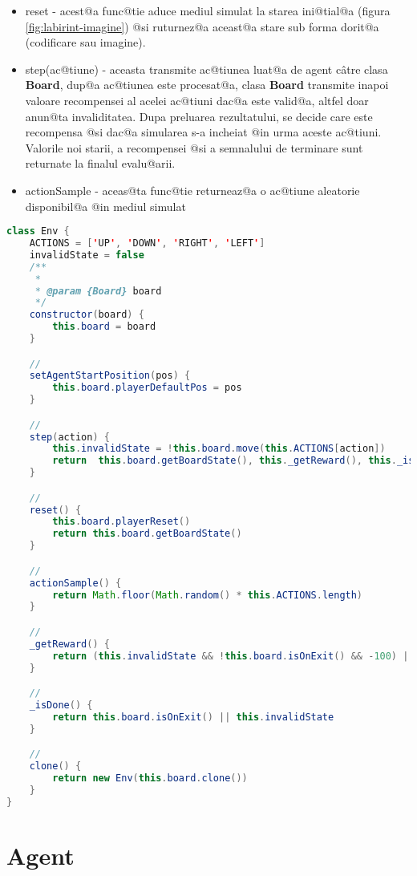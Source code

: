 \begin{itemize}
	\item reset - acest@a func@tie aduce mediul simulat la starea ini@tial@a (figura \ref{fig:labirint-imagine}) @si ruturnez@a aceast@a stare sub forma dorit@a (codificare sau imagine).
	\item step(ac@tiune) - aceasta transmite ac@tiunea luat@a de agent c\^ atre clasa \textbf{Board}, dup@a ac@tiunea este procesat@a, clasa \textbf{Board} transmite inapoi valoare recompensei al acelei ac@tiuni dac@a este valid@a, altfel doar anun@ta invaliditatea. Dupa preluarea rezultatului, se decide care este recompensa @si dac@a simularea s-a incheiat @in urma aceste ac@tiuni. Valorile noi starii, a recompensei @si a semnalului de terminare sunt returnate la finalul evalu@arii.
	\item actionSample - aceas@ta func@tie returneaz@a o ac@tiune aleatorie disponibil@a @in mediul simulat
\end{itemize}



\begin{lstlisting}[language=Java, caption=Definirea clasei Env]
class Env {
    ACTIONS = ['UP', 'DOWN', 'RIGHT', 'LEFT']
    invalidState = false
    /**
     * 
     * @param {Board} board 
     */
    constructor(board) {
        this.board = board
    }

    //
    setAgentStartPosition(pos) {
        this.board.playerDefaultPos = pos
    }

    // 
    step(action) {
        this.invalidState = !this.board.move(this.ACTIONS[action])
        return  this.board.getBoardState(), this._getReward(), this._isDone()]
    }

    //
    reset() {
        this.board.playerReset()
        return this.board.getBoardState()
    }

    //
    actionSample() {
        return Math.floor(Math.random() * this.ACTIONS.length)
    }

    //
    _getReward() {
        return (this.invalidState && !this.board.isOnExit() && -100) || this.board.getPlayerCellValue()
    }

    //
    _isDone() {
        return this.board.isOnExit() || this.invalidState
    }

    //
    clone() {
        return new Env(this.board.clone())
    }
}
\end{lstlisting}


\section{Agent}

